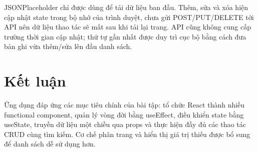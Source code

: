 \documentclass[12pt,a4paper]{article}
\newcommand{\code}[1]{\textsf{\small #1}}
\begin{document}
JSONPlaceholder chỉ được dùng để tải dữ liệu ban đầu. Thêm, sửa và xóa hiện cập nhật state trong bộ nhớ của trình duyệt, chưa gửi POST/PUT/DELETE tới API nên dữ liệu thao tác sẽ mất sau khi tải lại trang. API cũng không cung cấp trường thời gian cập nhật; thứ tự gần nhất được duy trì cục bộ bằng cách đưa bản ghi vừa thêm/sửa lên đầu danh sách.

\section*{Kết luận}
Ứng dụng đáp ứng các mục tiêu chính của bài tập: tổ chức React thành nhiều functional component, quản lý vòng đời bằng \code{useEffect}, điều khiển state bằng \code{useState}, truyền dữ liệu một chiều qua props và thực hiện đầy đủ các thao tác CRUD cùng tìm kiếm. Cơ chế phân trang và hiển thị giá trị thiếu được bổ sung để danh sách dễ sử dụng hơn.
\end{document}
